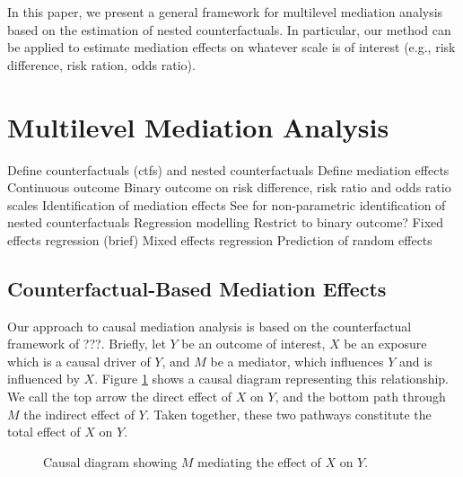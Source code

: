 \documentclass{article}
\begin{document}
In this paper, we present a general framework for multilevel mediation analysis based on the estimation of nested counterfactuals. In particular, our method can be applied to estimate mediation effects on whatever scale is of interest (e.g., risk difference, risk ration, odds ratio). 




\section{Multilevel Mediation Analysis}

\begin{outline}
    \1 Define counterfactuals (ctfs) and nested counterfactuals 
    \1 Define mediation effects
        \2 Continuous outcome
        \2 Binary outcome on risk difference, risk ratio and odds ratio scales
    \1 Identification of mediation effects
        \2 See \citet{Ima10I} for non-parametric identification of nested counterfactuals
    \1 Regression modelling
        \2 Restrict to binary outcome?
        \2 Fixed effects regression (brief)
        \2 Mixed effects regression
        \2 Prediction of random effects
\end{outline}


\subsection{Counterfactual-Based Mediation Effects}

Our approach to causal mediation analysis is based on the counterfactual framework of ???. Briefly, let $Y$ be an outcome of interest, $X$ be an exposure which is a causal driver of $Y$, and $M$ be a mediator, which influences $Y$ and is influenced by $X$. Figure \ref{fig:simp_med} shows a causal diagram representing this relationship. We call the top arrow the direct effect of $X$ on $Y$, and the bottom path through $M$ the indirect effect of $Y$. Taken together, these two pathways constitute the total effect of $X$ on $Y$.

\begin{figure}
    \centering
      \caption{Causal diagram showing $M$ mediating the effect of $X$ on $Y$.}    
      \label{fig:simp_med}
\end{figure}
\end{document}
